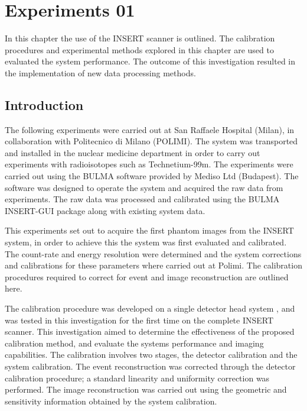 \chapter{Experiments 01}
\label{Milan}



In this chapter the use of the \acrshort{INSERT} scanner is outlined. The calibration procedures and experimental methods explored in this chapter are used to evaluated the system performance. The outcome of this investigation resulted in the implementation of new data processing methods. 

\section{Introduction}
The following experiments were carried out at San Raffaele Hospital (Milan), in collaboration with Politecnico di Milano (POLIMI). The system was transported and installed in the nuclear medicine department in order to carry out experiments with radioisotopes such as Technetium-99m. The experiments were carried out using the BULMA software provided by Mediso Ltd (Budapest). The software was designed to operate the system and acquired the raw data from experiments. The raw data was processed and calibrated using the BULMA INSERT-GUI package along with existing system data. 

This experiments set out to acquire the first phantom images from the \acrshort{INSERT} system, in order to achieve this the system was first evaluated and calibrated. The count-rate and energy resolution were determined and the system corrections and calibrations for these parameters where carried out at Polimi. The calibration procedures required to correct for event and image reconstruction are outlined here.

The calibration procedure was developed on a single detector head system \cite{DebCal}, and was tested in this investigation for the first time on the complete \acrshort{INSERT} scanner. This investigation aimed to determine the effectiveness of the proposed calibration method, and evaluate the systems performance and imaging capabilities. The calibration involves two stages, the detector calibration and the system calibration. The event reconstruction was corrected through the detector calibration procedure; a standard linearity and uniformity correction was performed. The image reconstruction was carried out using the geometric and sensitivity information obtained by the system calibration.

